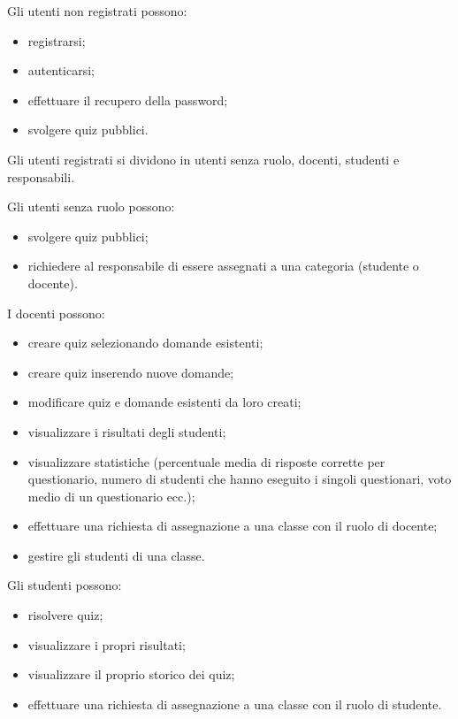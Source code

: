 \documentclass[a4paper, titlepage]{article}
\begin{document}
\bigskip

Gli utenti non registrati possono: 
\begin{itemize}
\item registrarsi;
\item autenticarsi;
\item effettuare il recupero della password;
\item svolgere quiz pubblici.
\end{itemize}

\bigskip

Gli utenti registrati si dividono in utenti senza ruolo, docenti, studenti e responsabili. 

\bigskip

Gli utenti senza ruolo possono:
\begin{itemize}
	\item svolgere quiz pubblici;
	\item richiedere al responsabile di essere assegnati a una categoria (studente o docente).
\end{itemize}

\bigskip

I docenti possono:
\begin{itemize}
\item creare quiz selezionando domande esistenti;
\item creare quiz inserendo nuove domande;
\item modificare quiz e domande esistenti da loro creati;
\item visualizzare i risultati degli studenti;
\item visualizzare statistiche (percentuale media di risposte corrette per questionario, numero di studenti che hanno eseguito i singoli questionari, voto medio di un questionario ecc.);
\item effettuare una richiesta di assegnazione a una classe con il ruolo di docente;
\item gestire gli studenti di una classe.
\end{itemize}

\bigskip

Gli studenti possono:
\begin{itemize}
\item risolvere quiz;
\item visualizzare i propri risultati;
\item visualizzare il proprio storico dei quiz;
\item effettuare una richiesta di assegnazione a una classe con il ruolo di studente.
\end{itemize}
\end{document}
